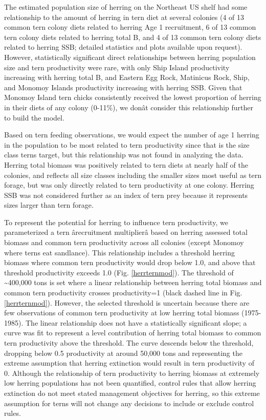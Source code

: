 \documentclass[]{article}
\begin{document}
The estimated population size of herring on the Northeast US shelf had
some relationship to the amount of herring in tern diet at several
colonies (4 of 13 common tern colony diets related to herring Age 1
recruitment, 6 of 13 common tern colony diets related to herring total
B, and 4 of 13 common tern colony diets related to herring SSB; detailed
statistics and plots available upon request). However, statistically
significant direct relationships between herring population size and
tern productivity were rare, with only Ship Island productivity
increasing with herring total B, and Eastern Egg Rock, Matinicus Rock,
Ship, and Monomoy Islands productivity increasing with herring SSB.
Given that Monomoy Island tern chicks consistently received the lowest
proportion of herring in their diets of any colony (0-11\%), we donât
consider this relationship further to build the model.

Based on tern feeding observations, we would expect the number of age 1
herring in the population to be most related to tern productivity since
that is the size class terns target, but this relationship was not found
in analyzing the data. Herring total biomass was positively related to
tern diets at nearly half of the colonies, and reflects all size classes
including the smaller sizes most useful as tern forage, but was only
directly related to tern productivity at one colony. Herring SSB was not
considered further as an index of tern prey because it represents sizes
larger than tern forage.

To represent the potential for herring to influence tern productivity,
we parameterized a tern ârecruitment multiplierâ based on herring
assessed total biomass and common tern productivity across all colonies
(except Monomoy where terns eat sandlance). This relationship includes a
threshold herring biomass where common tern productivity would drop
below 1.0, and above that threshold productivity exceeds 1.0 (Fig.
\ref{herrternmod}). The threshold of \textasciitilde{}400,000 tons is
set where a linear relationship between herring total biomass and common
tern productivity crosses productivity=1 (black dashed line in Fig.
\ref{herrternmod}). However, the selected threshold is uncertain because
there are few observations of common tern productivity at low herring
total biomass (1975-1985). The linear relationship does not have a
statistically significant slope; a curve was fit to represent a level
contribution of herring total biomass to common tern productivity above
the threshold. The curve descends below the threshold, dropping below
0.5 productivity at around 50,000 tons and representing the extreme
assumption that herring extinction would result in tern productivity of
0. Although the relationship of tern productivity to herring biomass at
extremely low herring populations has not been quantified, control rules
that allow herring extinction do not meet stated management objectives
for herring, so this extreme assumption for terns will not change any
decisions to include or exclude control rules.
\end{document}
